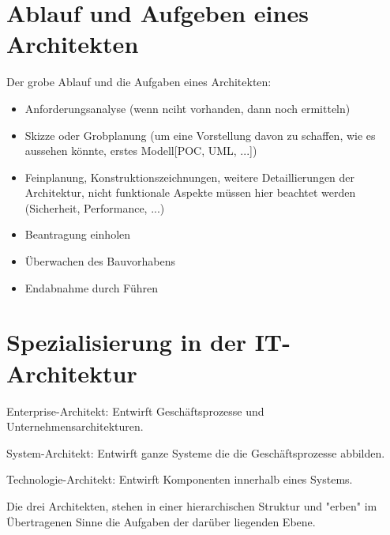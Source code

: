 \section{Ablauf und Aufgeben eines Architekten}
Der grobe Ablauf und die Aufgaben eines Architekten:
\begin{itemize}
	\item Anforderungsanalyse (wenn nciht vorhanden, dann noch ermitteln)
	\item Skizze oder Grobplanung (um eine Vorstellung davon zu schaffen, wie es aussehen könnte, erstes Modell[POC, UML, ...])
	\item Feinplanung, Konstruktionszeichnungen, weitere Detaillierungen der Architektur, nicht funktionale Aspekte müssen hier beachtet werden (Sicherheit, Performance, ...)
	\item Beantragung einholen
	\item Überwachen des Bauvorhabens
	\item Endabnahme durch Führen
\end{itemize}

\section{Spezialisierung in der IT-Architektur}
Enterprise-Architekt: Entwirft Geschäftsprozesse und Unternehmensarchitekturen.

System-Architekt: Entwirft ganze Systeme die die Geschäftsprozesse abbilden.

Technologie-Architekt: Entwirft Komponenten innerhalb eines Systems.

Die drei Architekten, stehen in einer hierarchischen Struktur und "erben" im Übertragenen Sinne die Aufgaben der darüber liegenden Ebene.

